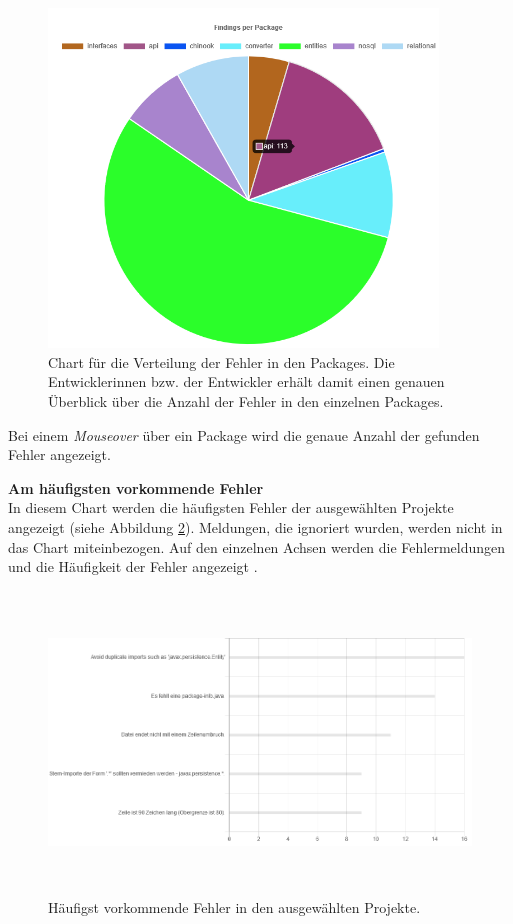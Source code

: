 \begin{figure}[tp]
  \centering
  \includegraphics[height=9cm]{images/findingsPerPackage.PNG}
 \caption[Chart für die Verteilung der Fehler in den Packages.]{Chart für die Verteilung der Fehler in den Packages. Die Entwicklerinnen bzw. der Entwickler erhält damit einen genauen Überblick über die Anzahl der Fehler in den einzelnen Packages.}
  \label{fig:findingsPackage}
\end{figure}

Bei einem \textit{Mouseover} über ein Package wird die genaue Anzahl der gefunden Fehler angezeigt.

\textbf{Am häufigsten vorkommende Fehler} \\
In diesem Chart werden die häufigsten Fehler der ausgewählten Projekte angezeigt (siehe Abbildung \ref{fig:mostCommonErrors}). Meldungen, die ignoriert wurden, werden nicht in das Chart miteinbezogen. Auf den einzelnen Achsen werden die Fehlermeldungen und die Häufigkeit der Fehler angezeigt .

\begin{figure}[tp]
  \centering
  \includegraphics[height=8cm]{images/mostCommonErrors.PNG}
 \caption[Häufigst vorkommende Fehler in den ausgewählten Projekte.]{Häufigst vorkommende Fehler in den ausgewählten Projekte.}
  \label{fig:mostCommonErrors}
\end{figure}

